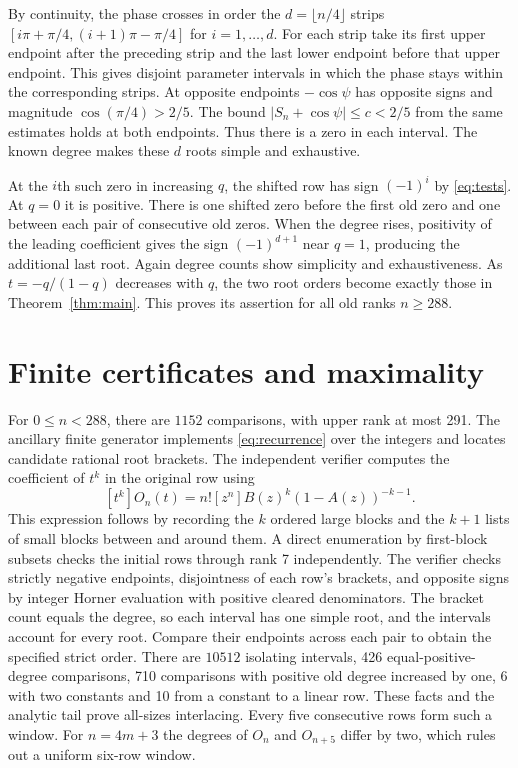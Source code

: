 \documentclass[11pt]{article}
\begin{document}
By continuity, the phase crosses in order the $d=\lfloor n/4\rfloor$
strips $[i\pi+\pi/4,(i+1)\pi-\pi/4]$ for $i=1,\dots,d$.
For each strip take its first upper endpoint after the preceding
strip and the last lower endpoint before that upper endpoint.
This gives disjoint parameter intervals in which the phase stays
within the corresponding strips. At opposite endpoints
$-\cos\psi$ has opposite signs and magnitude $\cos(\pi/4)>2/5$.
The bound $|S_n+\cos\psi|\le c<2/5$ from the same estimates
holds at both endpoints. Thus there is a zero in each interval.
The known degree makes these $d$ roots simple and exhaustive.

At the $i$th such zero in increasing $q$, the shifted row has
sign $(-1)^i$ by \eqref{eq:tests}. At $q=0$ it is positive.
There is one shifted zero before the first old zero and one
between each pair of consecutive old zeros. When the degree
rises, positivity of the leading coefficient gives the sign
$(-1)^{d+1}$ near $q=1$, producing the additional last root.
Again degree counts show simplicity and exhaustiveness.
As $t=-q/(1-q)$ decreases with $q$, the two root orders become
exactly those in Theorem~\ref{thm:main}. This proves its assertion
for all old ranks $n\ge288$.

\section{Finite certificates and maximality}
For $0\le n<288$, there are $1152$ comparisons, with upper rank
at most 291. The ancillary finite generator implements
\eqref{eq:recurrence} over the integers and locates candidate
rational root brackets. The independent verifier computes the
coefficient of $t^k$ in the original row using
\[
 [t^k]O_n(t)=n![z^n]B(z)^k(1-A(z))^{-k-1}.
\]
This expression follows by recording the $k$ ordered large
blocks and the $k+1$ lists of small blocks between and around them.
A direct enumeration by first-block subsets checks the
initial rows through rank 7 independently. The verifier checks
strictly negative endpoints, disjointness of each row's
brackets, and opposite signs by integer Horner evaluation with
positive cleared denominators. The bracket count equals the
degree, so each interval has one simple root, and the intervals
account for every root. Compare their endpoints across each
pair to obtain the specified strict order.
There are $10512$ isolating intervals, 426 equal-positive-degree
comparisons, 710 comparisons with positive old degree increased
by one, 6 with two constants and 10 from a constant to a linear
row. These facts and the analytic tail prove all-sizes
interlacing. Every five consecutive rows form such a window.
For $n=4m+3$ the degrees of $O_n$ and $O_{n+5}$ differ by two,
which rules out a uniform six-row window.
\end{document}
